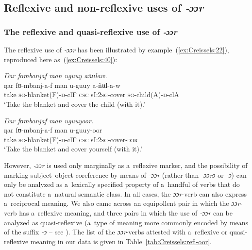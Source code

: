 \documentclass[output=paper]{langscibook}
\begin{document}
\subsection{Reflexive and non-reflexive uses of \textit{‑ɔɔr}}%
\label{sec:Creissels:oor}

\subsubsection{The reflexive and quasi-reflexive use of \textit{‑ɔɔr}}%
\label{sec:Creissels:refl-oor}

The reflexive use of \textit{‑ɔɔr} has been illustrated by
example~(\ref{ex:Creissels:22}), reproduced here as~(\ref{ex:Creissels:40}):

\ea
  \label{ex:Creissels:40}
  
    \ea\label{ex:Creissels:40a}
      \textit{Ŋar fʊmbanjaf man uguuy añɩɩlaw.}\\
      \gll ŋar fʊ-mbanj-a-f man u-guuy a-ñɩɩl-a-w\\
      take \textsc{sg}-blanket(F)-\textsc{d}-clF \textsc{csc} sI:\textsc{2sg}-cover \textsc{sg}-child(A)-\textsc{d}-clA\\
      \glt `Take the blanket and cover the child (with it).'

    \ex\label{ex:Creissels:40b}
      \textit{Ŋar fʊmbanjaf man uguuyoor.}\\
      \gll ŋar fʊ-mbanj-a-f man u-guuy-oor\\
      take \textsc{sg}-blanket(F)-\textsc{d}-clF \textsc{csc} sI:\textsc{2sg}-cover-\textsc{ɔɔr}\\
      \glt `Take the blanket and cover yourself (with it).'

  \z
\z

However, \textit{‑ɔɔr} is used only marginally as a~reflexive marker, and the possibility of marking subject--object coreference by means of \textit{‑ɔɔr} (rather than \textit{‑ɔɔrɔ} or \textit{‑ɔ}) can only be analyzed as a~lexically
specified property of a~handful of verbs that do not constitute a~natural
semantic class.  In all cases, the \textit{ɔɔr}‑verb can also express
a~reciprocal meaning.  We also came across an equipollent pair in which the
\textit{ɔɔr}-verb has a~reflexive meaning, and three pairs in which the use of
\textit{‑ɔɔr} can be analyzed as quasi-reflexive (a~type of meaning more commonly
encoded by means of the suffix \textit{‑ɔ} -- see
).  The list of the \textit{ɔɔr}-verbs attested
with a~reflexive or quasi-reflexive meaning in our data is given in
Table~\ref{tab:Creissels:refl-oor}.
\end{document}
